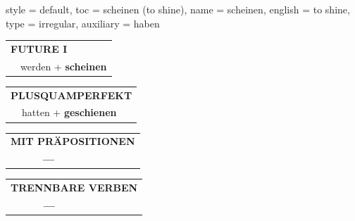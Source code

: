 \begin{verbentry}{
  style = {default},
  toc = {scheinen (to shine)},
  name = {scheinen},
  english = {to shine},
  type = {irregular},
  auxiliary = {haben}
}
\begin{tabular}{rl}
    \multicolumn{2}{l}{\textbf{FUTURE I} }\\
  &  werden + \textbf{scheinen}\\
 
  \end{tabular}
\hfill
   \begin{tabular}{rl}
      \multicolumn{2}{l}{\textbf{PLUSQUAMPERFEKT}}\\
  &  hatten + \textbf{geschienen}\\
  \end{tabular}
  
  \vspace{10pt}



\begin{tabular}{lll}
\multicolumn{3}{l}{\textbf{MIT PRÄPOSITIONEN}}\\
& \textbf{---} & \\
\end{tabular}
\hfill
\begin{tabular}{lll}
\multicolumn{3}{l}{\textbf{TRENNBARE VERBEN}}\\
& \textbf{---} & \\
\end{tabular}

\vspace{-5pt}
\end{verbentry}

